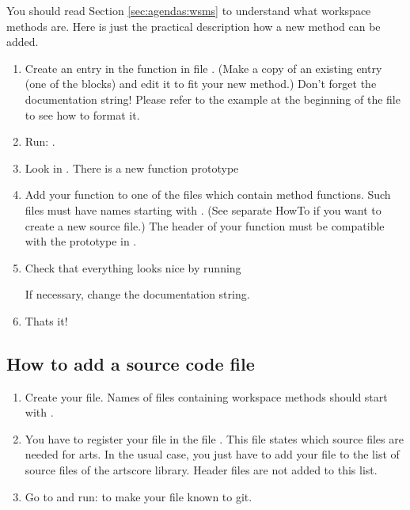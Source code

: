 You should read Section \ref{sec:agendas:wsms} to understand what workspace
methods are. Here is just the practical description how a new
method can be added.

\begin{enumerate}
\item Create an entry in the function  in file
  .  (Make a copy of an existing entry (one of the
   blocks) and edit it to fit your new
  method.) Don't forget the documentation string! Please refer to the
  example at the beginning of the file to see how to format it.
\item Run:
  .
\item Look in . There is a new function prototype
  \begin{quote}
  \end{quote}
\item Add your function to one of the  files which contain method
  functions. Such files must have names starting with . (See
  separate HowTo if you want to create a new source file.) The header
  of your function must be compatible with the prototype in .
\item Check that everything looks nice by running 
  \begin{quote}
  \end{quote}
  If necessary, change the documentation string.

\item Thats it!
\end{enumerate}


\subsection{How to add a source code file}
\begin{enumerate}
\item Create your file. Names of files containing workspace methods should
  start with .
\item You have to register your file in the file
  . This file states which source files
  are needed for arts. In the usual case, you just have to add your
   file to the list of source files of the artscore
  library. Header files are not added to this list.
\item Go to  and run:  to
  make your file known to git.
\end{enumerate}


